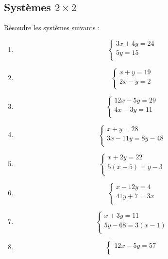 \subsection{Systèmes $2\times 2$}

\begin{exercice}
Résoudre les systèmes suivants :
\begin{multicols}{2}
\begin{enumerate}
\item $$\left\{ \begin{array} {l}
    3x+4y=24 \\ 
   5y=15 \\ 
\end{array} \right.$$ 
\item $$\left\{ \begin{array} {l}
    x+y=19 \\ 
   2x-y=2 \\ 
\end{array} \right.$$ 
\item $$\left\{ \begin{array} {l}
    12x-5y=29 \\ 
   4x-3y=11 \\ 
\end{array} \right.$$ 
\item $$\left\{ \begin{array} {l}
    x+y=28 \\ 
   3x-11y=8y-48 \\ 
\end{array} \right.$$ 
\item $$\left\{ \begin{array} {l}
    x+2y=22 \\ 
   5(x-5)=y-3 \\ 
\end{array} \right.$$ 
\item $$\left\{ \begin{array} {l}
    x-12y=4 \\ 
   41y+7=3x \\ 
\end{array} \right.$$ 
\item $$\left\{ \begin{array} {l}
    x+3y=11 \\ 
   5y-68=3(x-1) \\ 
\end{array} \right.$$ 
\item $$\left\{ \begin{array} {l}
    12x-5y=57 \\ 

\end{array}$$
\end{enumerate}
\end{multicols}
\end{exercice}
